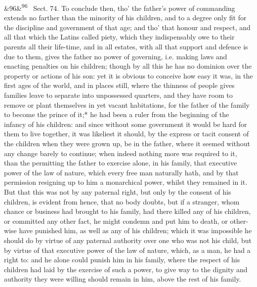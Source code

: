 \documentclass[12pt]{article}
\newcommand{\para}[1][]{\par\noindent\ifx&#1&\else\textsuperscript{\footnotesize #1}~\fi}
\begin{document}
\para[96] Sect. 74. To conclude then, tho' the father's power of commanding extends no farther than the minority of his children, and to a degree only fit for the discipline and government of that age; and tho' that honour and respect, and all that which the Latins called piety, which they indispensably owe to their parents all their life-time, and in all estates, with all that support and defence is due to them, gives the father no power of governing, i.e. making laws and enacting penalties on his children; though by all this he has no dominion over the property or actions of his son: yet it is obvious to conceive how easy it was, in the first ages of the world, and in places still, where the thinness of people gives families leave to separate into unpossessed quarters, and they have room to remove or plant themselves in yet vacant habitations, for the father of the family to become the prince of it;* he had been a ruler from the beginning of the infancy of his children: and since without some government it would be hard for them to live together, it was likeliest it should, by the express or tacit consent of the children when they were grown up, be in the father, where it seemed without any change barely to continue; when indeed nothing more was required to it, than the permitting the father to exercise alone, in his family, that executive power of the law of nature, which every free man naturally hath, and by that permission resigning up to him a monarchical power, whilst they remained in it. But that this was not by any paternal right, but only by the consent of his children, is evident from hence, that no body doubts, but if a stranger, whom chance or business had brought to his family, had there killed any of his children, or committed any other fact, he might condemn and put him to death, or other-wise have punished him, as well as any of his children; which it was impossible he should do by virtue of any paternal authority over one who was not his child, but by virtue of that executive power of the law of nature, which, as a man, he had a right to: and he alone could punish him in his family, where the respect of his children had laid by the exercise of such a power, to give way to the dignity and authority they were willing should remain in him, above the rest of his family.
\end{document}
